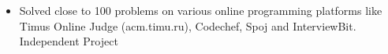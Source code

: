 \documentclass[10pt,a4paper]{article}
\begin{document}
\begin{itemize}[labelindent=1.5em,labelsep=-0.3cm,leftmargin=*]
\item \headedsubsection  %
  {{\normalfont Solved close to 100 problems on various online programming platforms like Timus Online Judge (acm.timu.ru), Codechef, Spoj and InterviewBit. }}{{{Independent Project}}}
  {}
 

\end{itemize}

\spacedhrule{0.5em}{-0.4em}
{}
{}
{}


\spacedhrule{0.5em}{-0.4em}
\end{document}
